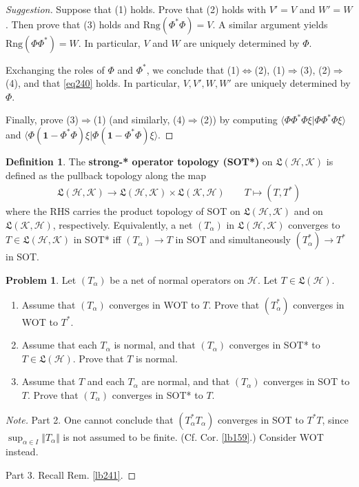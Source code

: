 \documentclass[12pt,b5paper,notitlepage]{article}
\theoremstyle{definition}
\newtheorem{df}{Definition}[subsection]
\newtheorem{prob}{\color{red}Problem}[section]
\theoremstyle{plain}
\newcommand{\fk}{\mathfrak}
\newcommand{\idt}{\mathbf{1}}
\newcommand{\bk}[1]{\langle {#1}\rangle}
\newcommand{\Rng}{\mathrm{Rng}}
\newcommand{\MH}{\mathcal H}
\newcommand{\MK}{\mathcal K}
\numberwithin{equation}{section}
\begin{document}
\begin{proof}[Suggestion]
Suppose that (1) holds. Prove that (2) holds with $V'=V$ and $W'=W$. Then prove that (3) holds and $\Rng(\Phi^*\Phi)=V$. A similar argument yields $\Rng(\Phi\Phi^*)=W$. In particular, $V$ and $W$ are uniquely determined by $\Phi$.

Exchanging the roles of $\Phi$ and $\Phi^*$, we conclude that (1)$\Leftrightarrow$(2), (1)$\Rightarrow$(3), (2)$\Rightarrow$(4), and that \eqref{eq240} holds. In particular, $V,V',W,W'$ are uniquely determined by $\Phi$.

Finally, prove (3)$\Rightarrow$(1) (and similarly, (4)$\Rightarrow$(2)) by computing $\bk{\Phi\Phi^*\Phi\xi|\Phi\Phi^*\Phi\xi}$ and $\bk{\Phi(\idt-\Phi^*\Phi)\xi|\Phi(\idt-\Phi^*\Phi)\xi}$.
\end{proof}


\begin{df}
The \textbf{strong-* operator topology (SOT*)}   on $\fk L(\MH,\MK)$ is defined as the pullback topology along the map
\begin{align*}
\fk L(\MH,\MK)\rightarrow\fk L(\MH,\MK)\times\fk L(\MK,\MH)\qquad T\mapsto (T,T^*)
\end{align*}
where the RHS carries the product topology of SOT on $\fk L(\MH,\MK)$ and on $\fk L(\MK,\MH)$, respectively. Equivalently, a net $(T_\alpha)$ in $\fk L(\MH,\MK)$ converges to $T\in\fk L(\MH,\MK)$ in SOT* iff $(T_\alpha)\rightarrow T$ in SOT and simultaneously $(T_\alpha^*)\rightarrow T^*$ in SOT.
\end{df}




\begin{prob}\label{lb337}
Let $(T_\alpha)$ be a net of normal operators on $\MH$. Let $T\in\fk L(\MH)$. 
\begin{enumerate}
\item Assume that $(T_\alpha)$ converges in WOT to $T$. Prove that $(T_\alpha^*)$ converges in WOT to $T^*$.
\item Assume that each $T_\alpha$ is normal, and that $(T_\alpha)$ converges in SOT* to $T\in\fk L(\MH)$. Prove that $T$ is normal.
\item Assume that $T$ and each $T_\alpha$ are normal, and that $(T_\alpha)$ converges in SOT to $T$. Prove that $(T_\alpha)$ converges in SOT* to $T$.
\end{enumerate}
\end{prob}


\begin{proof}[Note]
Part 2. One cannot conclude that $(T_\alpha^*T_\alpha)$ converges in SOT to $T^*T$, since $\sup_{\alpha\in I}\Vert T_\alpha\Vert$ is not assumed to be finite. (Cf. Cor. \ref{lb159}.) Consider WOT instead.

Part 3. Recall Rem. \ref{lb241}.
\end{proof}
\end{document}

